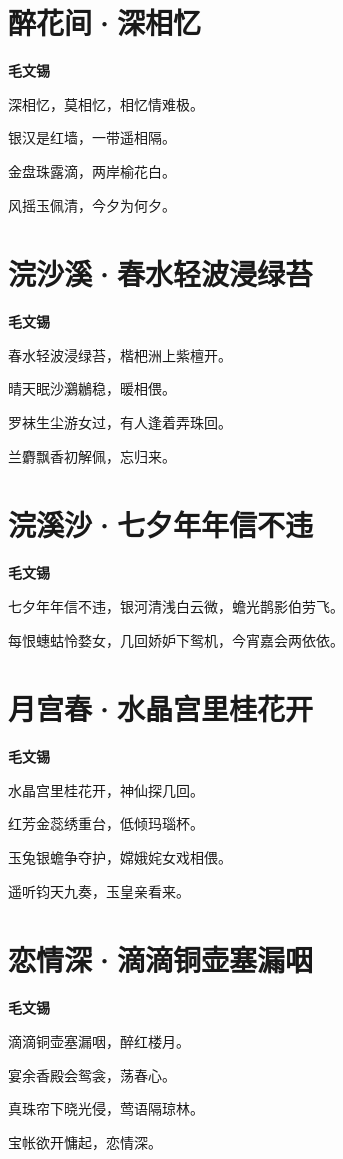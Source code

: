 \documentclass[12pt,a4paper]{ctexbook}
\begin{document}
\section{醉花间·深相忆}
\textbf{毛文锡}\par\vspace{0.5em}
深相忆，莫相忆，相忆情难极。\par
银汉是红墙，一带遥相隔。\par
金盘珠露滴，两岸榆花白。\par
风摇玉佩清，今夕为何夕。\par

\section{浣沙溪·春水轻波浸绿苔}
\textbf{毛文锡}\par\vspace{0.5em}
春水轻波浸绿苔，楷杷洲上紫檀开。\par
晴天眠沙鸂鶒稳，暖相偎。\par
罗袜生尘游女过，有人逢着弄珠回。\par
兰麝飘香初解佩，忘归来。\par

\section{浣溪沙·七夕年年信不违}
\textbf{毛文锡}\par\vspace{0.5em}
七夕年年信不违，银河清浅白云微，蟾光鹊影伯劳飞。\par
每恨蟪蛄怜婺女，几回娇妒下鸳机，今宵嘉会两依依。\par

\section{月宫春·水晶宫里桂花开}
\textbf{毛文锡}\par\vspace{0.5em}
水晶宫里桂花开，神仙探几回。\par
红芳金蕊绣重台，低倾玛瑙杯。\par
玉兔银蟾争夺护，嫦娥姹女戏相偎。\par
遥听钧天九奏，玉皇亲看来。\par

\section{恋情深·滴滴铜壶塞漏咽}
\textbf{毛文锡}\par\vspace{0.5em}
滴滴铜壶塞漏咽，醉红楼月。\par
宴余香殿会鸳衾，荡春心。\par
真珠帘下晓光侵，莺语隔琼林。\par
宝帐欲开慵起，恋情深。\par
\end{document}
